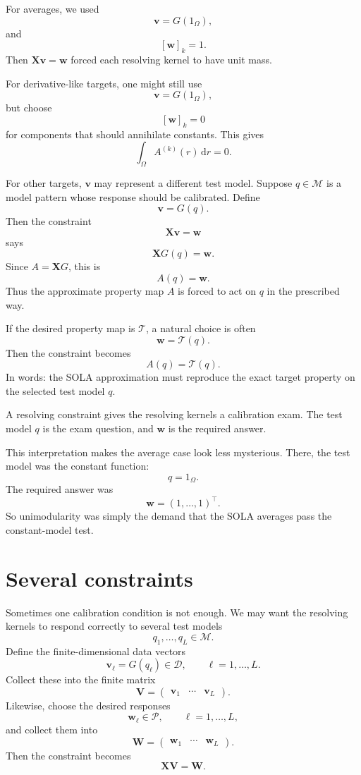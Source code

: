 \documentclass[11pt,openany]{book}
\theoremstyle{definition}
\theoremstyle{remark}
\newcommand{\M}{\mathcal M}
\newcommand{\D}{\mathcal D}
\newcommand{\Pspace}{\mathcal P}
\newcommand{\Tau}{\mathcal{T}}
\newcommand{\dd}{\,\mathrm d}
\begin{document}
For averages, we used
\[
  \mathbf v=G(1_\Omega),
\]
and
\[
  [\mathbf w]_k=1.
\]
Then \(\mathbf X\mathbf v=\mathbf w\) forced each resolving kernel to have unit mass.

For derivative-like targets, one might still use
\[
  \mathbf v=G(1_\Omega),
\]
but choose
\[
  [\mathbf w]_k=0
\]
for components that should annihilate constants. This gives
\[
  \int_\Omega A^{(k)}(r)\dd r=0.
\]

For other targets, \(\mathbf v\) may represent a different test model. Suppose \(q\in\M\) is a
model pattern whose response should be calibrated. Define
\[
  \mathbf v=G(q).
\]
Then the constraint
\[
  \mathbf X\mathbf v=\mathbf w
\]
says
\[
  \mathbf XG(q)=\mathbf w.
\]
Since \(A=\mathbf XG\), this is
\[
  A(q)=\mathbf w.
\]
Thus the approximate property map \(A\) is forced to act on \(q\) in the prescribed way.

If the desired property map is \(\Tau\), a natural choice is often
\[
  \mathbf w=\Tau(q).
\]
Then the constraint becomes
\[
  A(q)=\Tau(q).
\]
In words: the SOLA approximation must reproduce the exact target property on the selected
test model \(q\).

\begin{intuitionbox}
A resolving constraint gives the resolving kernels a calibration exam. The test model \(q\) is the
exam question, and \(\mathbf w\) is the required answer.
\end{intuitionbox}

This interpretation makes the average case look less mysterious. There, the test model was the
constant function:
\[
  q=1_\Omega.
\]
The required answer was
\[
  \mathbf w=(1,\dots,1)^\top.
\]
So unimodularity was simply the demand that the SOLA averages pass the constant-model test.

\section{Several constraints}

Sometimes one calibration condition is not enough. We may want the resolving kernels to
respond correctly to several test models
\[
  q_1,\dots,q_L\in\M.
\]
Define the finite-dimensional data vectors
\[
  \mathbf v_\ell=G(q_\ell)\in\D,
  \qquad \ell=1,\dots,L.
\]
Collect these into the finite matrix
\[
  \mathbf V
  =
  \begin{pmatrix}
    \mathbf v_1 & \cdots & \mathbf v_L
  \end{pmatrix}.
\]
Likewise, choose the desired responses
\[
  \mathbf w_\ell\in\Pspace,
  \qquad \ell=1,\dots,L,
\]
and collect them into
\[
  \mathbf W
  =
  \begin{pmatrix}
    \mathbf w_1 & \cdots & \mathbf w_L
  \end{pmatrix}.
\]
Then the constraint becomes
\[
  \mathbf X\mathbf V=\mathbf W.
\]
\end{document}
